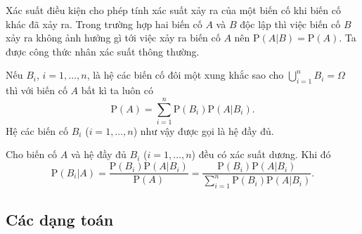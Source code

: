 \begin{note}
	Xác suất điều kiện cho phép tính xác suất xảy ra của một biến cố khi biến cố khác đã xảy ra. Trong trường hợp hai biến cố $A$ và $B$ độc lập thì việc biến cố $B$ xảy ra không ảnh hưởng gì tới việc xảy ra biến cố $A$ nên $\mathrm{P}(A|B)=\mathrm{P}(A)$. Ta được công thức nhân xác suất thông thường.
\end{note}

\begin{dl}
	Nếu $B_i$, $i=1,\ldots,n$, là hệ các biến cố đôi một xung khắc sao cho $\bigcup\limits_{i=1}^n B_i=\Omega$ thì với biến cố $A$ bất kì ta luôn có
	$$\mathrm{P}(A)=\displaystyle\sum\limits_{i=1}^n \mathrm{P}(B_i)\mathrm{P}(A|B_i).$$
	Hệ các biến cố $B_i$ ($i=1,\ldots,n$) như vậy được gọi là hệ đầy đủ.
\end{dl}

\begin{dl}
	Cho biến cố $A$ và hệ đầy đủ $B_i$ ($i=1,\ldots,n$) đều có xác suất dương. Khi đó
	$$\mathrm{P}(B_i|A)=\dfrac{\mathrm{P}(B_i)\mathrm{P}(A|B_i)}{\mathrm{P}(A)}=\dfrac{\mathrm{P}(B_i)\mathrm{P}(A|B_i)}{\displaystyle\sum\limits_{i=1}^n \mathrm{P}(B_i)\mathrm{P}(A|B_i)}.$$
\end{dl}
	
	
\subsection{Các dạng toán}

